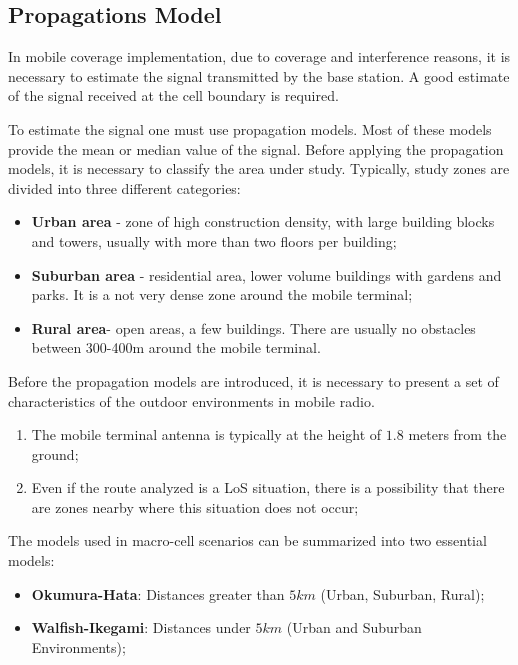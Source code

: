 \documentclass[letterpaper, 10 pt, conference]{ieeeconf}  %
\begin{document}
\subsection{Propagations Model}
In mobile coverage implementation, due to coverage and interference reasons, it is necessary to estimate the signal transmitted by the base station. A good estimate of the signal received at the cell boundary is required.\par\noindent
To estimate the signal one must use propagation models. Most of these models provide the mean or median value of the signal. 
Before applying the propagation models, it is necessary to classify the area under study. Typically, study zones are divided into three different categories:
\begin {itemize}
    \item \textbf{Urban area} - zone of high construction density, with large building blocks and towers, usually with more than two floors per building;
    \item \textbf{Suburban area} - residential area, lower volume buildings with gardens and parks. It is a not very dense zone around the mobile terminal;
    \item \textbf{Rural area}- open areas, a few buildings. There are usually no obstacles between 300-400m around the mobile terminal.
\end {itemize} \par\noindent
Before the propagation  models are introduced, it is necessary to present a set of characteristics of the outdoor environments in mobile radio.
\begin {enumerate}
    \item The mobile terminal antenna is typically at the height of $ 1.8 $ meters from the ground;
    \item Even if the route analyzed is a LoS situation, there is a possibility that there are zones nearby where this situation does not occur;
\end {enumerate}
The models used in macro-cell scenarios can be summarized into two essential models:
    \begin{itemize}
        \item \textbf{Okumura-Hata}: Distances greater than $ 5km $ (Urban, Suburban, Rural);
        \item \textbf{Walfish-Ikegami}: Distances under $ 5km $ (Urban and Suburban Environments);
    \end{itemize}
\end{document}
